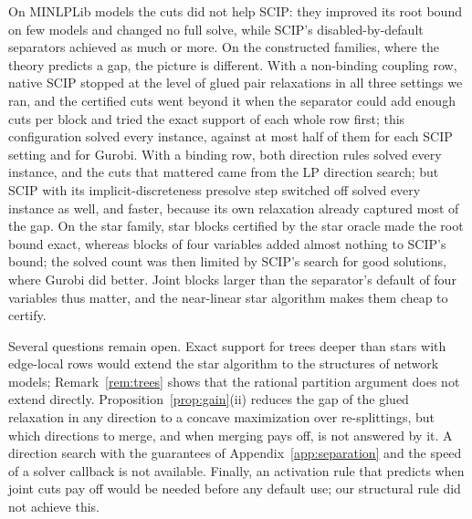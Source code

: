 On MINLPLib models the cuts did not help SCIP: they improved its root bound on
few models and changed no full solve, while SCIP's disabled-by-default
separators achieved as much or more. On the constructed families, where the
theory predicts a gap, the picture is different. With a non-binding coupling
row, native SCIP stopped at the level of glued pair relaxations in all three
settings we ran, and the certified cuts went beyond it when the separator could
add enough cuts per block and tried the exact support of each whole row first;
this configuration solved every instance, against at most half of them for
each SCIP setting and for Gurobi. With a binding row, both direction rules solved every
instance, and the cuts that mattered came from the LP direction search; but
SCIP with its implicit-discreteness presolve step switched off solved every
instance as well, and faster, because its own relaxation already captured most
of the gap. On the star family, star blocks certified by the star oracle made
the root bound exact, whereas blocks of four variables added almost nothing to
SCIP's bound; the solved count was then limited by SCIP's search for good
solutions, where Gurobi did better. Joint blocks larger than the separator's
default of four variables thus matter, and the near-linear star algorithm makes
them cheap to certify.

Several questions remain open. Exact support for trees deeper than stars with
edge-local rows would extend the star algorithm to the structures of network
models; Remark~\ref{rem:trees} shows that the rational partition argument
does not extend directly. Proposition~\ref{prop:gain}(ii) reduces the gap of
the glued relaxation in any direction to a concave maximization over
re-splittings, but which directions to merge, and when merging pays off, is
not answered by it. A direction search with the guarantees of
Appendix~\ref{app:separation} and the speed of a solver callback is not
available. Finally, an activation rule that predicts when joint cuts pay off
would be needed before any default use; our structural rule did not achieve
this.

